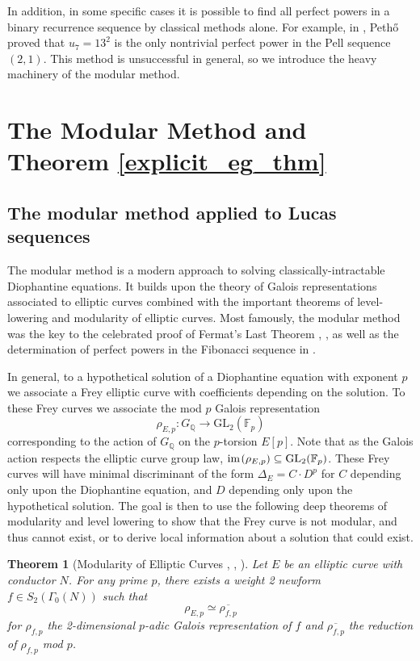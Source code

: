 \documentclass[12pt]{amsart}
\newtheorem{thm}{Theorem}[section]
\theoremstyle{definition}
\def\F{{\mathbb F}}
\def\Q{{\mathbb Q}}
\newcommand{\im}{\text{im} \hspace{0.1em} }
\newcommand{\GL}{\text{GL}}
\renewcommand{\bar}{\overline}
\begin{document}
In addition, in some specific cases it is possible to find all perfect powers in a binary recurrence sequence by classical methods alone.  For example, in \cite{petho92}, Peth{\H{o}} proved that $u_7 = 13^2$ is the only nontrivial perfect power in the Pell sequence $(2,1)$.  This method is unsuccessful in general, so we introduce the heavy machinery of the modular method.


\section{The Modular Method and Theorem \ref{explicit_eg_thm}}\label{mod_method}

\subsection{The modular method applied to Lucas sequences}

The modular method is a modern approach to solving classically-intractable Diophantine equations.  It builds upon the theory of Galois representations associated to elliptic curves combined with the important theorems of level-lowering and modularity of elliptic curves.  Most famously, the modular method was the key to the celebrated proof of Fermat's Last Theorem \cite{wiles95}, \cite{taylorwiles95}, as well as the determination of perfect powers in the Fibonacci sequence in \cite{siksek06}.

In general, to a hypothetical solution of a Diophantine equation with exponent $p$ we associate a Frey elliptic curve with coefficients depending on the solution.  To these Frey curves we associate the mod $p$ Galois representation
\[ \rho_{E,p} \colon G_{\Q} \rightarrow \GL_2(\F_p) \]
corresponding to the action of $G_\Q$ on the $p$-torsion $E[p]$.  Note that as the Galois action respects the elliptic curve group law, $\im(\rho_{E,p}) \subseteq \GL_2(\F_p)$. These Frey curves will have minimal discriminant of the form $\Delta_E = C \cdot D^p$ for $C$ depending only upon the Diophantine equation, and $D$ depending only upon the hypothetical solution.  The goal is then to use the following deep theorems of modularity and level lowering to show that the Frey curve is not modular, and thus cannot exist, or to derive local information about a solution that could exist. 

\begin{thm}[Modularity of Elliptic Curves \cite{wiles95}, \cite{taylorwiles95}, \cite{conrad01}]\label{modularity}
Let $E$ be an elliptic curve with conductor $N$.  For any prime $p$, there exists a weight 2 newform $f \in S_2(\Gamma_0(N))$ such that
\[ \rho_{E,p} \simeq \bar{\rho_{f,p}} \]
for $\rho_{f,p}$ the 2-dimensional $p$-adic Galois representation of $f$ and $\bar{\rho_{f,p}}$ the reduction of $\rho_{f,p}$ mod $p$.
\end{thm}
\end{document}
